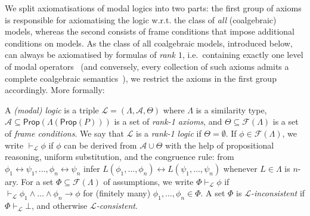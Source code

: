 \documentclass[proceedings]{stacs}
\theoremstyle{definition}
\theoremstyle{plain}
\newcommand{\entails}{\vdash}
\newcommand{\Lang}{\mathcal{L}}
\newcommand{\FLang}{\mathcal{F}}
\newcommand{\Prop}{\mathsf{Prop}}
\newcommand{\Ax}{\mathcal{A}}
\newcommand{\AtProp}{P}
\newcommand{\Form}{\FLang}
\newcommand{\biimpl}{\leftrightarrow}
\begin{document}
\noindent We split axiomatisations of modal logics into two parts: the
first group of axioms is responsible for axiomatising the logic
w.r.t. the class of \emph{all} (coalgebraic) models, whereas the
second consists of frame conditions that impose additional conditions
on models. As the class of all coalgebraic models, introduced below,
can always be axiomatised by formulas of \emph{rank $1$}, i.e.\
containing exactly one level of modal operators~\cite{Schroder07} (and
conversely, every collection of such axioms admits a complete
coalgebraic semantics~\cite{SchroderPattinson07mcs}), we restrict the
axioms in the first group accordingly.  More formally:
\begin{defi}
  A \emph{(modal) logic} is a triple $\Lang=(\Lambda, \Ax, \Theta)$
  where $\Lambda$ is a similarity type, $\Ax \subseteq
  \Prop(\Lambda(\Prop(\AtProp)))$ is a set of \emph{rank-1 axioms},
  and $\Theta \subseteq \Form(\Lambda)$ is a set of \emph{frame
    conditions}. We say that $\Lang$ is a \emph{rank-1 logic} if
  $\Theta=\emptyset$. If $\phi \in \Form(\Lambda)$, we write
  $\entails_{\Lang} \phi$ if $\phi$ can be derived from $\Ax \cup
  \Theta$ with the help of propositional reasoning, uniform
  substitution, and the congruence rule: from $\phi_1 \biimpl \psi_1,
  \dots, \phi_n \biimpl \psi_n$ infer $L(\phi_1, \dots, \phi_n)
  \biimpl L(\psi_1, \dots, \psi_n)$ whenever $L \in \Lambda$ is
  $n$-ary. For a set $\Phi \subseteq \Form(\Lambda)$ of assumptions,
  we write $\Phi \entails_{\Lang} \phi$ if $\entails_{\Lang} \phi_1
  \land \dots \land \phi_n \to \phi$ for (finitely many) $\phi_1,
  \dots, \phi_n \in \Phi$. A set $\Phi$ is \emph{$\Lang$-inconsistent}
  if $\Phi\entails_\Lang\bot$, and otherwise
  \emph{$\Lang$-consistent}.
\end{defi}
\end{document}
